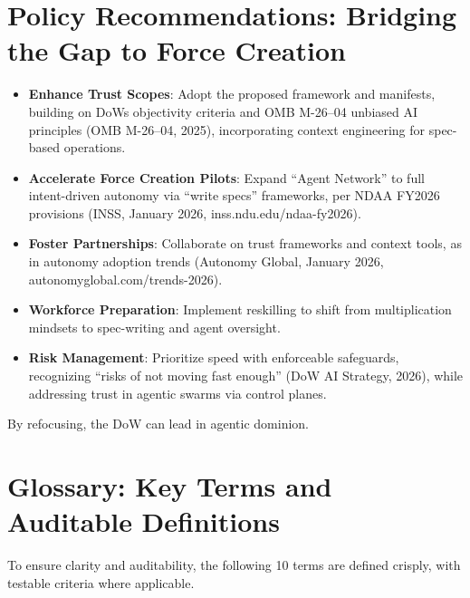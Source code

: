 \documentclass[11pt]{article}
\begin{document}
\section{Policy Recommendations: Bridging the Gap to Force Creation}\label{policy-recommendations-bridging-the-gap-to-force-creation}

\begin{itemize}
\item
  \textbf{Enhance Trust Scopes}: Adopt the proposed framework and manifests, building on DoW\textquotesingle s objectivity criteria and OMB M-26--04 unbiased AI principles (OMB M-26--04, 2025), incorporating context engineering for spec-based operations.
\item
  \textbf{Accelerate Force Creation Pilots}: Expand ``Agent Network'' to full intent-driven autonomy via ``write specs'' frameworks, per NDAA FY2026 provisions (INSS, January 2026, inss.ndu.edu/ndaa-fy2026).
\item
  \textbf{Foster Partnerships}: Collaborate on trust frameworks and context tools, as in autonomy adoption trends (Autonomy Global, January 2026, autonomyglobal.com/trends-2026).
\item
  \textbf{Workforce Preparation}: Implement reskilling to shift from multiplication mindsets to spec-writing and agent oversight.
\item
  \textbf{Risk Management}: Prioritize speed with enforceable safeguards, recognizing ``risks of not moving fast enough'' (DoW AI Strategy, 2026), while addressing trust in agentic swarms via control planes.
\end{itemize}

By refocusing, the DoW can lead in agentic dominion.

\section{Glossary: Key Terms and Auditable Definitions}\label{glossary-key-terms-and-auditable-definitions}

To ensure clarity and auditability, the following 10 terms are defined crisply, with testable criteria where applicable.
\end{document}
